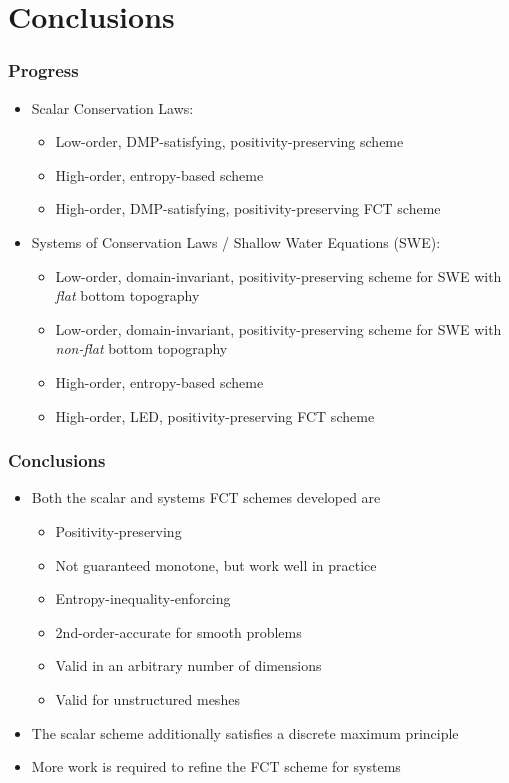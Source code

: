 \documentclass{beamer} \useoutertheme{infolines}
\begin{document}
\section{Conclusions}
\begin{frame}
\frametitle{Progress}

\begin{itemize}
  \item Scalar Conservation Laws:
    \begin{itemize}
      \item[\checked] Low-order, DMP-satisfying, positivity-preserving scheme
      \item[\checked] High-order, entropy-based scheme
      \item[\checked] High-order, DMP-satisfying, positivity-preserving FCT scheme
    \end{itemize}
 \item Systems of Conservation Laws / Shallow Water Equations (SWE):
   \begin{itemize}
     \item[\checked] Low-order, domain-invariant, positivity-preserving scheme
       for SWE with \emph{flat} bottom topography
     \item[\unchecked] Low-order, domain-invariant, positivity-preserving scheme
       for SWE with \emph{non-flat} bottom topography
     \item[\checked] High-order, entropy-based scheme
     \item[\unchecked] High-order, LED, positivity-preserving FCT scheme
   \end{itemize}
\end{itemize}

\end{frame}
\begin{frame}
\frametitle{Conclusions}

\begin{itemize}
  \item Both the scalar and systems FCT schemes developed are
    \begin{itemize}
      \item Positivity-preserving
      \item Not guaranteed monotone, but work well in practice
      \item Entropy-inequality-enforcing
      \item 2nd-order-accurate for smooth problems
      \item Valid in an arbitrary number of dimensions
      \item Valid for unstructured meshes
    \end{itemize}
  \item The scalar scheme additionally satisfies a discrete maximum principle
  \item More work is required to refine the FCT scheme for systems
\end{itemize}

\end{frame}
\end{document}
